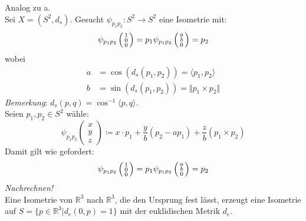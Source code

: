 \begin{problem*}[1b]
  Analog zu a. \\
  Sei \( X = (S^2, d_s) \). Gesucht \( \psi_{p_1p_2}: S^2 \to S^2 \) eine Isometrie mit:
  \begin{equation*}
    \psi_{p_1p_2} \left(\begin{smallmatrix}
      1 \\ 0 \\ 0
    \end{smallmatrix} \right) = p_1 \\
    \psi_{p_1p_2} \left(\begin{smallmatrix}
      a \\ b \\ 0
    \end{smallmatrix} \right) = p_2
  \end{equation*}	
  wobei 
  \begin{align*}
    a &= \cos(d_s(p_1,p_2)) = \langle p_1, p_2 \rangle \\
    b &= \sin (d_s(p_1,p_2)) = \Vert p_1 \times p_2 \Vert
  \end{align*}
  \emph{Bemerkung}: \( d_s(p,q) = \cos^{-1} \langle p,q \rangle \). \\
  Seien \( p_1, p_2 \in S^2 \) wähle:
  \begin{equation*}
    \psi_{p_1 p_2}\left(\begin{smallmatrix}
      x \\ y \\ z
    \end{smallmatrix} \right) \coloneqq x \cdot p_1 + \frac{y}{b} (p_2-ap_1) + \frac{z}{b}(p_1 \times p_2)
  \end{equation*}
  Damit gilt wie gefordert: 
  \begin{equation*}
    \psi_{p_1p_2}\left(\begin{smallmatrix}
      1\\ 0 \\ 0
    \end{smallmatrix} \right) = p_1 \\
    \psi_{p_1p_2}\left(\begin{smallmatrix}
      a \\ b \\ 0
    \end{smallmatrix} \right) = p_2
  \end{equation*}
  \emph{Nachrechnen!} \\
  Eine Isometrie von \( \mathbb{R}^3 \) nach \( \mathbb{R}^3 \), die den Ursprung fest lässt, erzeugt eine Isometrie auf \( S = \{ p \in \mathbb{R}^3 | d_e(0,p) = 1 \} \) mit der euklidischen Metrik \( d_e \). \\

\end{problem*}
